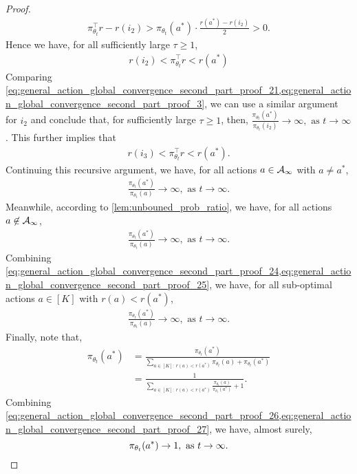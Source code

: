\begin{proof}
\begin{align}
\label{eq:general_action_global_convergence_second_part_proof_20}
    \pi_{\theta_t}^\top r - r(i_2) > \pi_{\theta_t}(a^*) \cdot \frac{ r(a^*) - r(i_2)}{2} > 0.
\end{align}
Hence we have, for all sufficiently large $\tau \ge 1$,
\begin{align}
\label{eq:general_action_global_convergence_second_part_proof_21}
    r(i_2) < \pi_{\theta_t}^\top r < r(a^*)
\end{align}
Comparing \cref{eq:general_action_global_convergence_second_part_proof_21,eq:general_action_global_convergence_second_part_proof_3}, we can use a similar argument for $i_2$ and conclude that, for sufficiently large $\tau \geq 1$, then, $\frac{ \pi_{\theta_t}(a^*) }{ \pi_{\theta_t}(i_2)} \to \infty, \text{ as } t \to \infty$. This further implies that
\begin{align}
r(i_3) < \pi_{\theta_t}^\top r < r(a^*).    
\end{align}
Continuing this recursive argument, we have, for all actions $a \in {\mathcal{A}}_\infty$ with $a \ne a^*$,
\begin{align}
\label{eq:general_action_global_convergence_second_part_proof_24}
    \frac{ \pi_{\theta_t}(a^*) }{ \pi_{\theta_t}(a)} \to \infty, \text{ as } t \to \infty.
\end{align}
Meanwhile, according to \cref{lem:unbouned_prob_ratio}, we have, for all actions $a \not\in {\mathcal{A}}_\infty$,
\begin{align}
\label{eq:general_action_global_convergence_second_part_proof_25}
    \frac{ \pi_{\theta_t}(a^*) }{ \pi_{\theta_t}(a)} \to \infty, \text{ as } t \to \infty.
\end{align}
Combining \cref{eq:general_action_global_convergence_second_part_proof_24,eq:general_action_global_convergence_second_part_proof_25}, we have, for all sub-optimal actions $a \in [K]$ with $r(a) < r(a^*)$,
\begin{align}
\label{eq:general_action_global_convergence_second_part_proof_26}
    \frac{ \pi_{\theta_t}(a^*) }{ \pi_{\theta_t}(a)} \to \infty, \text{ as } t \to \infty.
\end{align}
Finally, note that, 
\begin{align}
    \pi_{\theta_t}(a^*)
    &= \frac{\pi_{\theta_t}(a^*)}{ \sum_{a \in [K]: \ r(a) < r(a^*)} \pi_{\theta_t}(a) +  \pi_{\theta_t}(a^*)} \\
    &= \frac{1}{ \sum_{a \in [K]: \ r(a) < r(a^*)} \frac{\pi_{\theta_t}(a)}{\pi_{\theta_t}(a^*)}  +  1} \label{eq:general_action_global_convergence_second_part_proof_27}.
\end{align}
Combining \cref{eq:general_action_global_convergence_second_part_proof_26,eq:general_action_global_convergence_second_part_proof_27}, we have, almost surely,
\begin{equation*}
    \pi_{\theta_t}(a^*) \to 1, \text{ as } t \to \infty. \qedhere
\end{equation*}
\end{proof}

